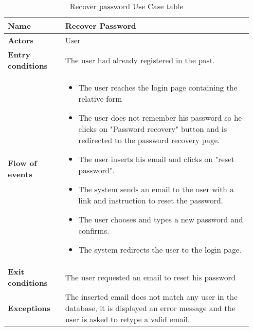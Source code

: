 \begin{table}[!htbp]
	\centering
	\begin{tabular}{lp{8cm}}
		\bf\large Name&\bf\large Recover Password \\
		\hline
		\hline
		\bf Actors&User\\
		\hline
		\bf Entry conditions&The user had already registered in the past.\\
		\hline
		\bf Flow of events&
		\begin{itemize}
			\item The user reaches the login page containing the relative form
			\item The user does not remember his password so he clicks on "Password recovery" button and is redirected to the password recovery page.
			\item The user inserts his email and clicks on "reset password".
			\item The system sends an email to the user with a link and instruction to reset the password.
			\item The user chooses and types a new password and confirms.
			\item The system redirects the user to the login page.
		\end{itemize}
		\\
		\hline
		\bf Exit conditions&The user requested an email to reset his password \\
		\hline
		\bf Exceptions&The inserted email does not match any user in the database, it is displayed an error message and the user is asked to retype a valid email.\\
		\hline
		
	\end{tabular}
	\caption{Recover password Use Case table} \label{tab:recoverpassword}
\end{table}